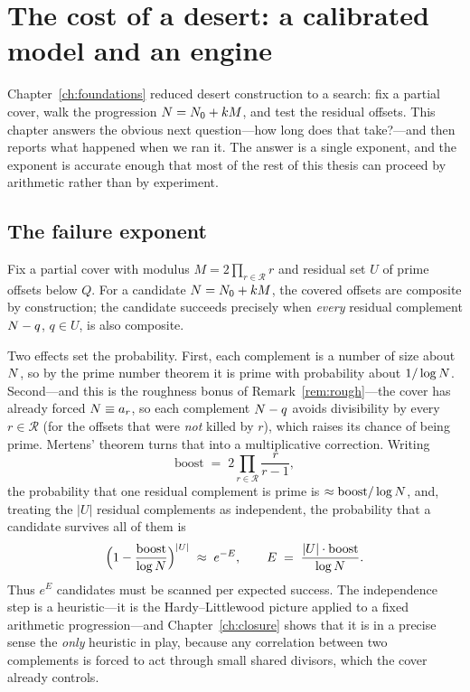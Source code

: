 \chapter{The cost of a desert: a calibrated model and an engine}\label{ch:engineering}

Chapter~\ref{ch:foundations} reduced desert construction to a search: fix a
partial cover, walk the progression $N=N_0+kM$, and test the residual offsets.
This chapter answers the obvious next question---how long does that take?---and
then reports what happened when we ran it. The answer is a single exponent, and
the exponent is accurate enough that most of the rest of this thesis can proceed
by arithmetic rather than by experiment.

\section{The failure exponent}

Fix a partial cover with modulus $M=2\prod_{r\in\mathcal R}r$ and residual set
$U$ of prime offsets below $Q$. For a candidate $N=N_0+kM$, the covered
offsets are composite by construction; the candidate succeeds precisely when
\emph{every} residual complement $N-q$, $q\in U$, is also composite.

Two effects set the probability. First, each complement is a number of size
about $N$, so by the prime number theorem it is prime with probability about
$1/\log N$. Second---and this is the roughness bonus of
Remark~\ref{rem:rough}---the cover has already forced $N\equiv a_r$, so each
complement $N-q$ avoids divisibility by every $r\in\mathcal R$ (for the
offsets that were \emph{not} killed by $r$), which raises its chance of being
prime. Mertens' theorem turns that into a multiplicative correction. Writing
\begin{equation}\label{eq:boost}
\mathrm{boost}\;=\;2\prod_{r\in\mathcal R}\frac{r}{r-1},
\end{equation}
the probability that one residual complement is prime is
$\approx\mathrm{boost}/\log N$, and, treating the $|U|$ residual complements as
independent, the probability that a candidate survives all of them is
\[
\Bigl(1-\frac{\mathrm{boost}}{\log N}\Bigr)^{|U|}\;\approx\;e^{-E},
\qquad
E\;=\;\frac{|U|\cdot \mathrm{boost}}{\log N}.
\]
Thus $e^{E}$ candidates must be scanned per expected success. The independence
step is a heuristic---it is the Hardy--Littlewood picture applied to a fixed
arithmetic progression---and Chapter~\ref{ch:closure} shows that it is in a
precise sense the \emph{only} heuristic in play, because any correlation between
two complements is forced to act through small shared divisors, which the cover
already controls.

